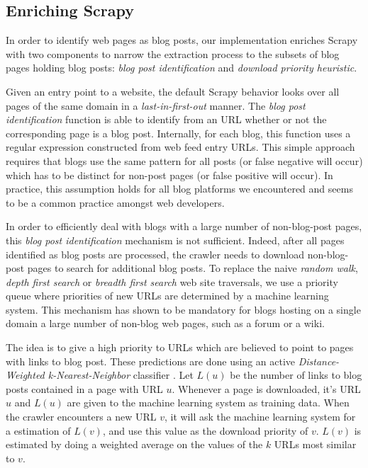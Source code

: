 \subsection{Enriching Scrapy}\label{enrichingscrapy}
In order to identify web pages as blog posts, our implementation enriches Scrapy with two components to narrow the extraction process to the subsets of blog pages holding blog posts: \emph{blog post identification} and \emph{download priority heuristic}.

Given an entry point to a website, the default Scrapy behavior looks over all pages of the same domain in a \emph{last-in-first-out} manner. The \emph{blog post identification} function is able to identify from an URL whether or not the corresponding page is a blog post. Internally, for each blog, this function uses a regular expression constructed from web feed entry URLs. This simple approach requires that blogs use the same pattern for all posts (or false negative will occur) which has to be distinct for non-post pages (or false positive will occur). In practice, this assumption holds for all blog platforms we encountered and seems to be a common practice amongst web developers.

In order to efficiently deal with blogs with a large number of non-blog-post pages, this \emph{blog post identification} mechanism is not sufficient. Indeed, after all pages identified as blog posts are processed, the crawler needs to download non-blog-post pages to search for additional blog posts. To replace the naive \emph{random walk}, \emph{depth first search} or \emph{breadth first search} web site traversals, we use a priority queue where priorities of new URLs are determined by a machine learning system. This mechanism has shown to be mandatory for blogs hosting on a single domain a large number of non-blog web pages, such as a forum or a wiki.

The idea is to give a high priority to URLs which are believed to point to pages with links to blog post. These predictions are done using an active \emph{Distance-Weighted k-Nearest-Neighbor} classifier \cite{dudani1976}. Let $L(u)$ be the number of links to blog posts contained in a page with URL $u$. Whenever a page is downloaded, it's URL $u$ and $L(u)$ are given to the machine learning system as training data. When the crawler encounters a new URL $v$, it will ask the machine learning system for a estimation of $L(v)$, and use this value as the download priority of $v$. $L(v)$ is estimated by doing a weighted average on the values of the $k$ URLs most similar to $v$.

